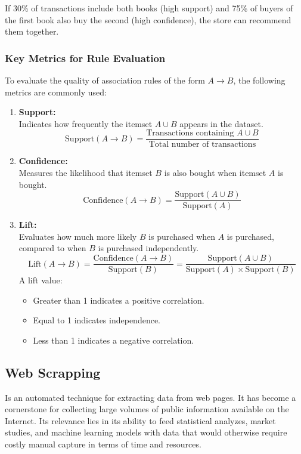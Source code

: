 \documentclass[runningheads]{llncs}
\begin{document}
If 30\% of transactions include both books (high support) and 75\% of buyers of the first book also buy the second (high confidence), the store can recommend them together.
\subsubsection{Key Metrics for Rule Evaluation}

To evaluate the quality of association rules of the form \( A \rightarrow B \), the following metrics are commonly used:

\begin{enumerate}
	\item \textbf{Support:} \\
	Indicates how frequently the itemset \( A \cup B \) appears in the dataset.
	\[
	\text{Support}(A \rightarrow B) = \frac{\text{Transactions containing } A \cup B}{\text{Total number of transactions}}
	\]
	
	\item \textbf{Confidence:} \\
	Measures the likelihood that itemset \( B \) is also bought when itemset \( A \) is bought.
	\[
	\text{Confidence}(A \rightarrow B) = \frac{\text{Support}(A \cup B)}{\text{Support}(A)}
	\]
	
	\item \textbf{Lift:} \\
	Evaluates how much more likely \( B \) is purchased when \( A \) is purchased, compared to when \( B \) is purchased independently.
	\[
	\text{Lift}(A \rightarrow B) = \frac{\text{Confidence}(A \rightarrow B)}{\text{Support}(B)} = \frac{\text{Support}(A \cup B)}{\text{Support}(A) \times \text{Support}(B)}
	\]
	A lift value:
	\begin{itemize}
		\item Greater than 1 indicates a positive correlation.
		\item Equal to 1 indicates independence.
		\item Less than 1 indicates a negative correlation.
	\end{itemize}
\end{enumerate}

\subsection{Web Scrapping}

Is an automated technique for extracting data from web pages. It has become a cornerstone for collecting large volumes of public information available on the Internet. Its relevance lies in its ability to feed statistical analyzes, market studies, and machine learning models with data that would otherwise require costly manual capture in terms of time and resources. \cite{gfg_web_scraping}
\end{document}
